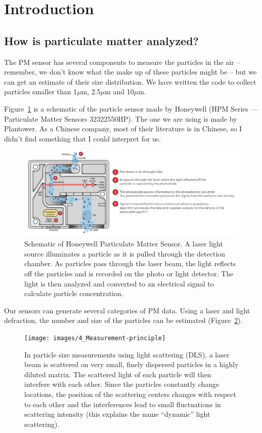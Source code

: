 \documentclass{article}\usepackage[]{graphicx}\usepackage[]{color}
\begin{document}
\section{Introduction}

\subsection{How is particulate matter analyzed?}

The PM sensor has several components to measure the particles in the air -- remember, we don't know what the make up of these particles might be -- but we can get an estimate of their size distribution. We have written the code to collect particles smaller than 1$\mu$m, 2.5$\mu$m and 10$\mu$m. 

Figure~\ref{fig:hpsensor} is a schematic of the particle sensor made by Honeywell (HPM Series --- Particulate Matter Sensors 32322550HP). The one we are using is made by Plantower. As a Chinese company, most of their literature is in Chinese, so I didn't find something that I could interpret for us. 

\begin{figure}
\includegraphics[width=1.00\textwidth]{images/4_SensorSchematic}
\caption{Schematic of Honeywell Particulate Matter Sensor. A laser light source illuminates a particle as it is pulled through the detection chamber. As particles pass through the laser beam, the light reflects off the particles and is recorded on the photo or light detector. The light is then analyzed and converted to an electrical signal to calculate particle concentration.}
\label{fig:hpsensor}
\end{figure}

Our sensors can generate several categories of PM data. Using a laser and light defraction, the number and size of the particles can be estimated (Figure~\ref{fig:defraction}).

\begin{figure}
\texttt{[image: images/4\_Measurement-principle]}
\caption{In particle size measurements using light scattering (DLS), a laser beam is scattered on very small, finely dispersed particles in a highly diluted matrix. 
The scattered light of each particle will then interfere with each other. Since the particles constantly change locations, the position of the scattering centers changes with respect to each other and the interferences lead to small fluctuations in scattering intensity (this explains the name ``dynamic'' light scattering).}
\label{fig:defraction}
\end{figure}
\end{document}
